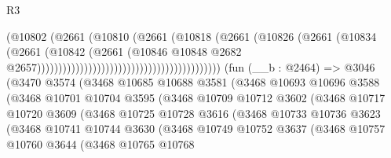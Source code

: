\begin{lexlean}{R3}
\begin{coremodule}
                                                                (@10802
                                                                  (@2661
                                                                    (@10810
                                                                      (@2661
                                                                        (@10818
                                                                          (@2661
                                                                            (@10826
                                                                              (@2661
                                                                                (@10834
                                                                                  (@2661
                                                                                    (@10842
                                                                                      (@2661
                                                                                        (@10846
                                                                                          @10848
                                                                                          @2682
                                                                                          @2657)))))))))))))))))))))))))))))))))))))))))))
    (fun (__b : @2464) =>
    @3046
      (@3470
        @3574
        (@3468
          @10685
          @10688
          @3581
          (@3468
            @10693
            @10696
            @3588
            (@3468
              @10701
              @10704
              @3595
              (@3468
                @10709
                @10712
                @3602
                (@3468
                  @10717
                  @10720
                  @3609
                  (@3468
                    @10725
                    @10728
                    @3616
                    (@3468
                      @10733
                      @10736
                      @3623
                      (@3468
                        @10741
                        @10744
                        @3630
                        (@3468
                          @10749
                          @10752
                          @3637
                          (@3468
                            @10757
                            @10760
                            @3644
                            (@3468
                              @10765
                              @10768

\end{coremodule}
\end{lexlean}
